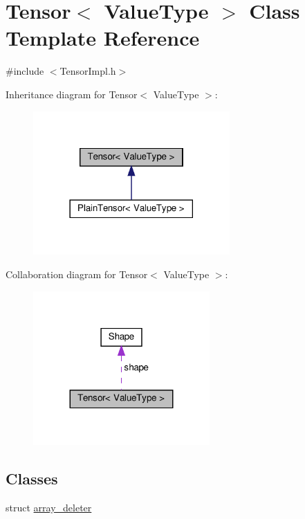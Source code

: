 \hypertarget{classTensor}{}\section{Tensor$<$ Value\+Type $>$ Class Template Reference}
\label{classTensor}


{\ttfamily \#include $<$Tensor\+Impl.\+h$>$}



Inheritance diagram for Tensor$<$ Value\+Type $>$\+:
\nopagebreak
\begin{figure}[H]
\begin{center}
\leavevmode
\includegraphics[width=213pt]{classTensor__inherit__graph}
\end{center}
\end{figure}


Collaboration diagram for Tensor$<$ Value\+Type $>$\+:
\nopagebreak
\begin{figure}[H]
\begin{center}
\leavevmode
\includegraphics[width=191pt]{classTensor__coll__graph}
\end{center}
\end{figure}
\subsection*{Classes}
\begin{DoxyCompactItemize}
\item 
struct \hyperlink{structTensor_1_1array__deleter}{array\+\_\+deleter}
\end{DoxyCompactItemize}
